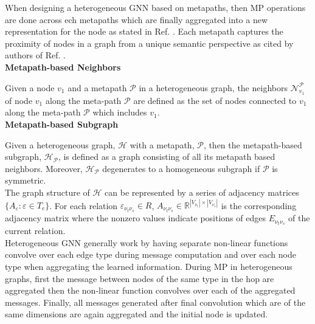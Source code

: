 \documentclass{report} %
\begin{document}
When designing a heterogeneous \ac{GNN} based on metapaths, then \ac{MP} operations are done across ech metapaths which are finally aggregated into a new representation for the node as stated in Ref. \cite{ML HGNN-2023}.
Each metapath captures the proximity of nodes in a graph from a unique semantic perspective as cited by authors of Ref. \cite{HGNN-2020}. \\

\textbf{Metapath-based Neighbors}

Given a node $v_1$ and a metapath $\mathcal{P}$ in a heterogeneous graph, the neighbors \( \mathcal{N}_{v_1}^{\mathcal{P}} \) of 
node $v_1$ along the meta-path $\mathcal{P}$ are defined as the set of nodes connected to $ v_1$ along the meta-path $\mathcal{P}$ which includes $v_1$. \\

\textbf{Metapath-based Subgraph}

Given a heterogeneous graph, $\mathcal{H}$ with a metapath, $\mathcal{P}$, then the metapath-based subgraph, $\mathcal{H_P}$, is defined as a graph consisting of all 
its metapath based neighbors. Moreover, $\mathcal{H_P}$ degenerates to a homogeneous subgraph if $\mathcal{P}$ is symmetric.\\

The graph structure of $\mathcal{H}$  can be represented by a series of adjacency matrices \(\{A_\varepsilon : \varepsilon \in T_e\}\). 
For each relation $\varepsilon_{\nu_t \nu_s} \in R$, $A_{\nu_t \nu_s} \in \mathbb{R}^{|V_{\nu_t}| \times |V_{\nu_s}|}$ is the corresponding 
adjacency matrix where the nonzero values indicate positions of edges $E_{\nu_t \nu_s}$ of the current relation.\\

Heterogeneous \ac{GNN} generally work by having separate non-linear functions convolve over each edge type during message computation and over each node type when 
aggregating the learned information. During \ac{MP} in heterogeneous graphs, first the message between nodes of the same type in the hop are aggregated then the non-linear 
function convolves over each of the aggregated messages. Finally, all messages generated after final convolution which are of the same dimensions are again aggregated 
and the initial node is updated.
\end{document}
